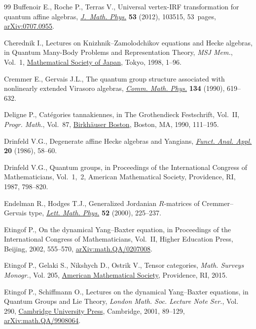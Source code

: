 \begin{thebibliography}{99}
Buffenoir E., Roche P., Terras V., Universal vertex-{IRF} transformation for
 quantum affine algebras, \href{https://doi.org/10.1063/1.4754699}{\textit{J.~Math. Phys.}} \textbf{53} (2012), 103515,
 53~pages, \href{https://arxiv.org/abs/0707.0955}{arXiv:0707.0955}.

Cherednik I., Lectures on {K}nizhnik--{Z}amolodchikov equations and {H}ecke
 algebras, in Quantum {M}any-{B}ody {P}roblems and {R}epresentation {T}heory,
 \textit{MSJ Mem.}, Vol.~1, \href{https://doi.org/10.2969/msjmemoirs/00101C010}{Mathematical Society of Japan}, Tokyo, 1998, 1--96.

Cremmer E., Gervais J.L., The quantum group structure associated with
 nonlinearly extended {V}irasoro algebras, \href{https://doi.org/10.1007/BF02098449}{\textit{Comm. Math. Phys.}}
 \textbf{134} (1990), 619--632.

Deligne P., Cat\'egories tannakiennes, in The {G}rothendieck {F}estschrift,
 {V}ol.~{II}, \textit{Progr. Math.}, Vol.~87, \href{https://doi.org/10.1007/978-0-8176-4575-5_3}{Birkh\"auser Boston}, Boston, MA,
 1990, 111--195.

Drinfeld V.G., Degenerate affine {H}ecke algebras and {Y}angians,
 \href{https://doi.org/10.1007/BF01077318}{\textit{Funct. Anal. Appl.}} \textbf{20} (1986), 58--60.

Drinfeld V.G., Quantum groups, in Proceedings of the {I}nternational {C}ongress
 of {M}athematicians, {V}ol.~1,~2, American Mathematical Society, Providence,
 RI, 1987, 798--820.

Endelman R., Hodges T.J., Generalized {J}ordanian {$R$}-matrices of
 {C}remmer--{G}ervais type, \href{https://doi.org/10.1023/A:1007693603336}{\textit{Lett. Math. Phys.}} \textbf{52} (2000),
 225--237.

Etingof P., On the dynamical {Y}ang--{B}axter equation, in Proceedings of the
 {I}nternational {C}ongress of {M}athematicians, {V}ol.~{II}, Higher Education
 Press, Beijing, 2002, 555--570, \href{https://arxiv.org/abs/math.QA/0207008}{arXiv:math.QA/0207008}.

Etingof P., Gelaki S., Nikshych D., Ostrik V., Tensor categories, \textit{Math.
 Surveys Monogr.}, Vol. 205, \href{https://doi.org/10.1090/surv/205}{American Mathematical Society}, Providence, RI,
 2015.

Etingof P., Schiffmann O., Lectures on the dynamical {Y}ang--{B}axter
 equations, in Quantum {G}roups and {L}ie {T}heory, \textit{London Math. Soc.
 Lecture Note Ser.}, Vol. 290, \href{https://doi.org/10.1017/CBO9780511542848.007}{Cambridge University Press}, Cambridge, 2001,
 89--129, \href{https://arxiv.org/abs/math.QA/9908064}{arXiv:math.QA/9908064}.


\end{thebibliography}
